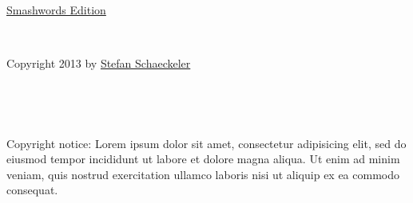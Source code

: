 \begin{center}

\ %

\centerline{\href{http://www.smashwords.com/}{Smashwords Edition}}

\ %

\centerline{Copyright 2013 by \href{http://students.engr.scu.edu/~sschaeck/}{Stefan Schaeckeler}}
\end{center}

\ %

\ %

Copyright notice: Lorem ipsum dolor sit amet, consectetur adipisicing elit, sed do eiusmod tempor incididunt ut labore et dolore magna aliqua. Ut enim ad minim veniam, quis nostrud exercitation ullamco laboris nisi ut aliquip ex ea commodo consequat.

\ %
